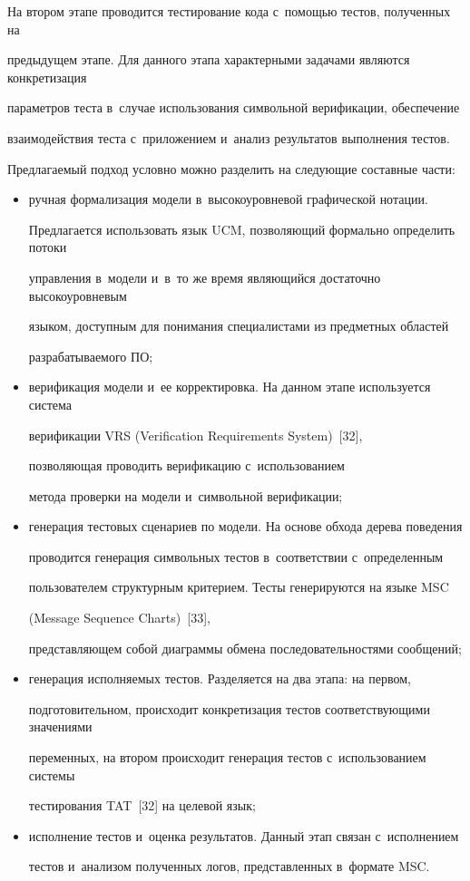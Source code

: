    На втором этапе проводится тестирование кода с~помощью тестов, полученных на


предыдущем этапе. Для данного этапа характерными задачами являются конкретизация


параметров теста в~случае использования символьной верификации, обеспечение


взаимодействия теста с~приложением и~анализ результатов выполнения тестов.





   Предлагаемый подход условно можно разделить на следующие составные части:


   \begin{itemize}


\item ручная формализация модели в~высокоуровневой графической нотации.


Предлагается использовать язык UCM, позволяющий формально определить потоки


управления в~модели и~в~то же время являющийся достаточно высокоуровневым


языком, доступным для понимания специалистами из предметных областей


разрабатываемого ПО;


\item верификация модели и~ее корректировка. На данном этапе используется система


верификации VRS (Verification Requirements System)~[32],


позволяющая проводить верификацию с~использованием


метода проверки на модели и~символьной верификации;


\item генерация тестовых сценариев по модели. На основе обхода дерева поведения


проводится генерация символьных тестов в~соответствии с~определенным


пользователем структурным критерием. Тесты генерируются на языке MSC


(Message Sequence Charts)~[33],


представляющем собой диаграммы обмена последовательностями сообщений;


\item генерация исполняемых тестов. Разделяется на два этапа: на первом,


подготовительном, происходит конкретизация тестов соответствующими значениями


переменных, на втором происходит генерация тестов с~использованием системы


тестирования TAT~[32] на целевой язык;


\item исполнение тестов и~оценка результатов. Данный этап связан с~исполнением


тестов и~анализом полученных логов, представленных в~формате MSC.


\end{itemize}





